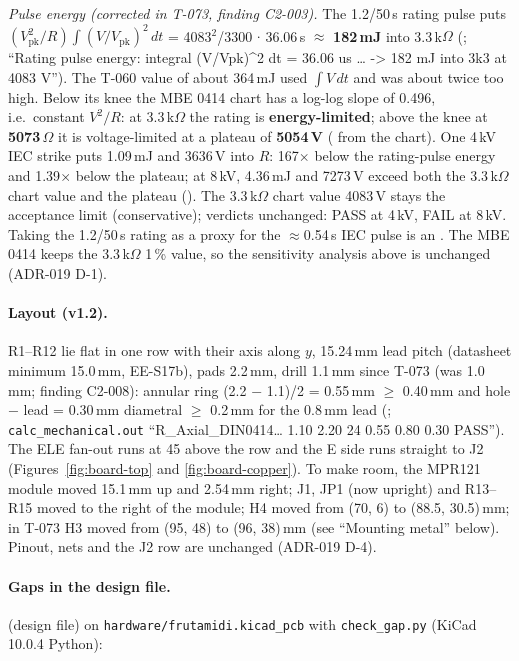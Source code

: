 \emph{Pulse energy (corrected in T-073, finding C2-003).} The 1.2/50\,\textmu s
rating pulse puts $(V_\mathrm{pk}^2/R)\int (V/V_\mathrm{pk})^2\,dt$ =
4083$^2$/3300 $\cdot$ 36.06\,\textmu s $\approx$ \textbf{182\,mJ} into 3.3\,k$\Omega$
(; ``Rating pulse energy: integral (V/Vpk)\^{}2 dt = 36.06 us
\ldots{} -> 182 mJ into 3k3 at 4083 V''). The T-060 value of about 364\,mJ used
$\int V\,dt$ and was about twice too high. Below its knee the MBE 0414 chart has a
log-log slope of 0.496, i.e.\ constant $V^2/R$: at 3.3\,k$\Omega$ the rating is
\textbf{energy-limited}; above the knee at \textbf{5073\,$\Omega$} it is
voltage-limited at a plateau of \textbf{5054\,V} ( from the
 chart). One 4\,kV IEC strike puts 1.09\,mJ and 3636\,V into $R$:
167$\times$ below the rating-pulse energy and 1.39$\times$ below the plateau; at
8\,kV, 4.36\,mJ and 7273\,V exceed both the 3.3\,k$\Omega$ chart value and the
plateau (). The 3.3\,k$\Omega$ chart value 4083\,V stays the
acceptance limit (conservative); verdicts unchanged: PASS at 4\,kV, FAIL at 8\,kV.
Taking the 1.2/50\,\textmu s rating as a proxy for the $\approx$0.54\,\textmu s IEC
pulse is an . The MBE 0414 keeps the 3.3\,k$\Omega$ 1\,\% value, so the
sensitivity analysis above is unchanged (ADR-019 D-1).

\paragraph{Layout (v1.2).} R1--R12 lie flat in one row with their axis along $y$,
15.24\,mm lead pitch (datasheet minimum 15.0\,mm,  EE-S17b), pads
2.2\,mm, drill 1.1\,mm since T-073 (was 1.0\,mm; finding C2-008): annular ring
(2.2 $-$ 1.1)/2 = 0.55\,mm $\ge$ 0.40\,mm and hole $-$ lead = 0.30\,mm diametral
$\ge$ 0.2\,mm for the 0.8\,mm lead (; \nolinkurl{calc_mechanical.out}
``R\_Axial\_DIN0414\ldots{} 1.10 2.20 24 0.55 0.80 0.30 PASS''). The ELE fan-out runs at 45\textdegree{} above the row and the
E side runs straight to J2 (Figures~\ref{fig:board-top} and \ref{fig:board-copper}).
To make room, the MPR121 module moved 15.1\,mm up and 2.54\,mm right; J1, JP1
(now upright) and R13--R15 moved to the right of the module; H4 moved from (70, 6)
to (88.5, 30.5)\,mm; in T-073 H3 moved from (95, 48) to (96, 38)\,mm (see
``Mounting metal'' below). Pinout, nets and the J2 row are unchanged (ADR-019 D-4).

\paragraph{Gaps in the design file.}  (design file) on
\nolinkurl{hardware/frutamidi.kicad_pcb} with \nolinkurl{check_gap.py} (KiCad
10.0.4 Python):

